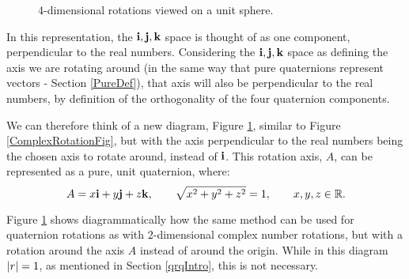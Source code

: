 \documentclass[10pt]{article}
\begin{document}
\begin{figure}[ht]
    \centering
    \caption{4-dimensional rotations viewed on a unit sphere.}
    \label{4DRotationsLike2DFig}
\end{figure}

In this representation, the $\vb{i,j,k}$ space is thought of as one component, perpendicular to the real numbers. Considering the $\vb{i,j,k}$ space as defining the axis we are rotating around (in the same way that pure quaternions represent vectors - Section \ref{PureDef}), that axis will also be perpendicular to the real numbers, by definition of the orthogonality of the four quaternion components.

We can therefore think of a new diagram, Figure \ref{4DRotationsLike2DFig}, similar to Figure \ref{ComplexRotationFig}, but with the axis perpendicular to the real numbers being the chosen axis to rotate around, instead of $\vb{i}$. This rotation axis, $A$, can be represented as a pure, unit quaternion, where:
\begin{equation}
    A = x\vb{i} + y\vb{j} + z\vb{k}, \quad\quad
    \sqrt{x^2 + y^2 + z^2} = 1, \quad\quad
    x, y, z \in \mathbb{R}.
\end{equation}

Figure \ref{4DRotationsLike2DFig} shows diagrammatically how the same method can be used for quaternion rotations as with 2-dimensional complex number rotations, but with a rotation around the axis $A$ instead of around the origin. While in this diagram $\abs{r} = 1$, as mentioned in Section \ref{qrqIntro}, this is not necessary.
\end{document}
